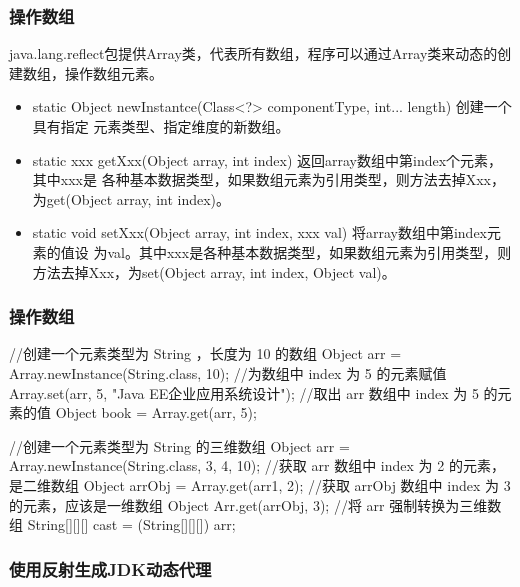 \documentclass[hyperref={pdfpagelabels=false},compress,table]{beamer} %
\begin{document}
\begin{frame}[fragile] %
\frametitle{操作数组}

java.lang.reflect包提供Array类，代表所有数组，程序可以通过Array类来动态的创建数组，操作数组元素。

\begin{itemize}
\item static Object newInstantce(Class<?> componentType, int... length) 创建一个具有指定
  元素类型、指定维度的新数组。
\item static xxx getXxx(Object array, int index) 返回array数组中第index个元素，其中xxx是
  各种基本数据类型，如果数组元素为引用类型，则方法去掉Xxx，为get(Object array, int
  index)。
\item static void setXxx(Object array, int index, xxx val) 将array数组中第index元素的值设
  为val。其中xxx是各种基本数据类型，如果数组元素为引用类型，则方法去掉Xxx，为set(Object
  array, int index, Object val)。
\end{itemize}
\end{frame}

\begin{frame}[fragile] %
\frametitle{操作数组}
\begin{javaCode}
//创建一个元素类型为 String ，长度为 10 的数组
Object arr = Array.newInstance(String.class, 10);
//为数组中 index 为 5 的元素赋值
Array.set(arr, 5, "Java EE企业应用系统设计");
//取出 arr 数组中 index 为 5 的元素的值
Object book = Array.get(arr, 5);

//创建一个元素类型为 String 的三维数组
Object arr = Array.newInstance(String.class, 3, 4, 10);
//获取 arr 数组中 index 为 2 的元素，是二维数组
Object arrObj = Array.get(arr1, 2);
//获取 arrObj 数组中 index 为 3 的元素，应该是一维数组
Object Arr.get(arrObj, 3);
//将 arr 强制转换为三维数组
String[][][] cast = (String[][][]) arr;
\end{javaCode}
\end{frame}

\begin{frame}[fragile] %
\frametitle{使用反射生成JDK动态代理}






\end{frame}





\end{document}
